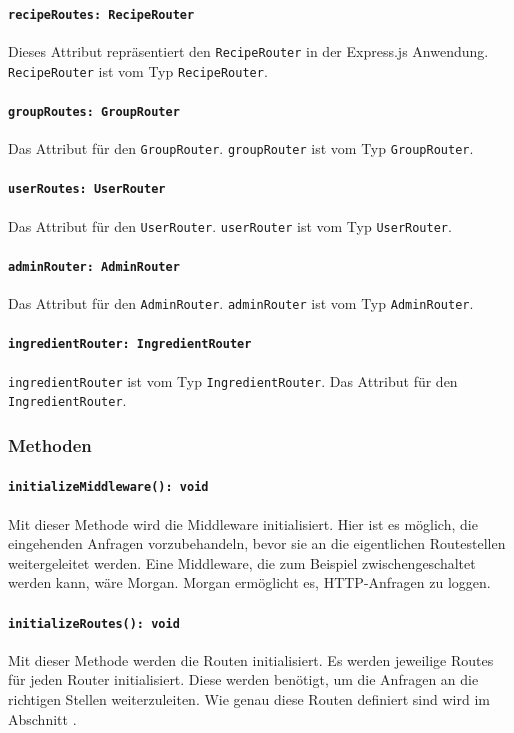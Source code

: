 \documentclass{entwurfsheft}
\begin{document}
\paragraph{\texttt{recipeRoutes: RecipeRouter}}
Dieses Attribut repräsentiert den \texttt{RecipeRouter} in der Express.js Anwendung. \texttt{RecipeRouter} ist vom Typ \texttt{RecipeRouter}.
\paragraph{\texttt{groupRoutes: GroupRouter}}
Das Attribut für den \texttt{GroupRouter}. \texttt{groupRouter} ist vom \newline
Typ \texttt{GroupRouter}.
\paragraph{\texttt{userRoutes: UserRouter}}
Das Attribut für den \texttt{UserRouter}. \texttt{userRouter} ist vom Typ \newline
\texttt{UserRouter}.
\paragraph{\texttt{adminRouter: AdminRouter}}
Das Attribut für den \texttt{AdminRouter}. \texttt{adminRouter} ist vom Typ \texttt{AdminRouter}.
\paragraph{\texttt{ingredientRouter: IngredientRouter}}
\texttt{ingredientRouter} ist vom Typ \texttt{IngredientRouter}.
Das Attribut für den \texttt{IngredientRouter}. \newline

\subsubsection*{Methoden}
\paragraph{\texttt{initializeMiddleware(): void}}
Mit dieser Methode wird die Middleware initialisiert. Hier ist es möglich, die eingehenden Anfragen vorzubehandeln, bevor sie an die eigentlichen Routestellen weitergeleitet werden.
Eine Middleware, die zum Beispiel zwischengeschaltet werden kann, wäre Morgan. Morgan ermöglicht es, HTTP-Anfragen zu loggen.
\paragraph{\texttt{initializeRoutes(): void}}
Mit dieser Methode werden die Routen initialisiert.
Es werden jeweilige Routes für jeden Router initialisiert. Diese werden benötigt, um die Anfragen an die richtigen Stellen weiterzuleiten.
Wie genau diese Routen definiert sind wird im Abschnitt .
\end{document}
